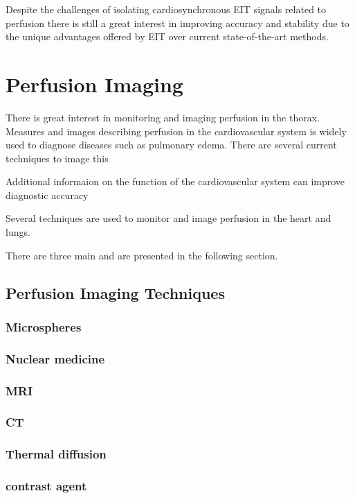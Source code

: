 Despite the challenges of isolating cardiosynchronous EIT signals related to 
perfusion there is still a great interest in 
improving accuracy and stability due to the unique 
advantages offered by EIT over current state-of-the-art methods.

\section{Perfusion Imaging}


There is great interest in monitoring and imaging perfusion in the thorax.
Measures and images describing perfusion in the cardiovascular 
system is widely used to diagnose diseases such as pulmonary edema. 
There are several current techniques to image this


Additional informaion on the function of the cardiovascular system can
improve diagnostic accuracy 

Several techniques are used to monitor and image perfusion in the heart 
and lungs.

There are three main  
and are presented in the following section. 

\subsection{Perfusion Imaging Techniques}
\subsubsection{Microspheres}
\subsubsection{Nuclear medicine}
\subsubsection{MRI}
\subsubsection{CT}
\subsubsection{Thermal diffusion}
\subsubsection{contrast agent}
